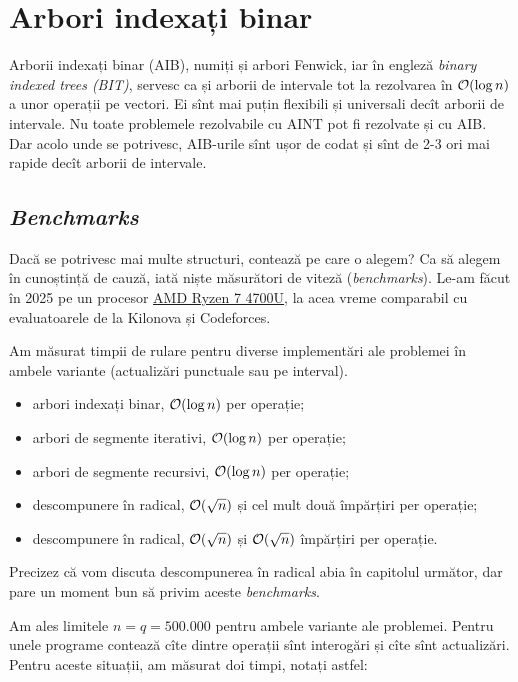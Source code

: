 \documentclass[../main.tex]{subfiles}
\begin{document}
\chapter{Arbori indexați binar}

Arborii indexați binar (AIB), numiți și arbori Fenwick, iar în engleză \textit{binary indexed trees (BIT)}, servesc ca și arborii de intervale tot la rezolvarea în $\mathcal{O}(\log n)$ a unor operații pe vectori. Ei sînt mai puțin flexibili și universali decît arborii de intervale. Nu toate problemele rezolvabile cu AINT pot fi rezolvate și cu AIB. Dar acolo unde se potrivesc, AIB-urile sînt ușor de codat și sînt de 2-3 ori mai rapide decît arborii de intervale.

\section{\textit{Benchmarks}}

Dacă se potrivesc mai multe structuri, contează pe care o alegem? Ca să alegem în cunoștință de cauză, iată niște măsurători de viteză (\textit{benchmarks}). Le-am făcut în 2025 pe un procesor \href{https://www.cpubenchmark.net/cpu.php?cpu=AMD+Ryzen+7+4700U}{AMD Ryzen 7 4700U}, la acea vreme comparabil cu evaluatoarele de la Kilonova și Codeforces.

Am măsurat timpii de rulare pentru diverse implementări ale problemei în ambele variante (actualizări punctuale sau pe interval).

\begin{itemize}
  \item arbori indexați binar, $\mathcal{O}(\log n)$ per operație;
  \item arbori de segmente iterativi, $\mathcal{O}(\log n)$ per operație;
  \item arbori de segmente recursivi, $\mathcal{O}(\log n)$ per operație;
  \item descompunere în radical, $\mathcal{O}(\sqrt{n})$ și cel mult două împărțiri per operație;
  \item descompunere în radical, $\mathcal{O}(\sqrt{n})$ și $\mathcal{O}(\sqrt{n})$ împărțiri per operație.
\end{itemize}

Precizez că vom discuta descompunerea în radical abia în capitolul următor, dar pare un moment bun să privim aceste \textit{benchmarks}.

Am ales limitele $n = q = 500.000$ pentru ambele variante ale problemei. Pentru unele programe contează cîte dintre operații sînt interogări și cîte sînt actualizări. Pentru aceste situații, am măsurat doi timpi, notați astfel:
\end{document}
